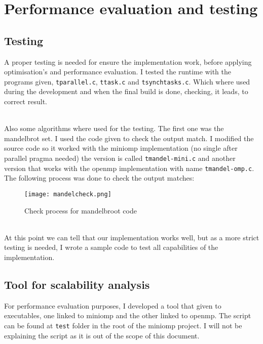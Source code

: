 \section{Performance evaluation and testing}

\subsection{Testing}
A proper testing is needed for ensure the implementation work, before applying optimisation's and performance evaluation. I tested the runtime with the programs given, \texttt{tparallel.c}, \texttt{ttask.c} and \texttt{tsynchtasks.c}. Which where used during the development and when the final build is done, checking, it leads, to correct result.

\par ~\\
Also some algorithms where used for the testing. The first one was the mandelbrot set. I used the code given to check the output match. I modified the source code so it worked with the miniomp implementation (no single after parallel pragma needed) the version is called \texttt{tmandel-mini.c} and another version that works with the openmp implementation with name \texttt{tmandel-omp.c}. The following process was done to check the output matches:

\begin{figure}[h!]
    \centering
    \texttt{[image: mandelcheck.png]}
    \caption{Check process for mandelbroot code}
\end{figure}
\par ~\\
At this point we can tell that our implementation works well, but as a more strict testing is needed, I wrote a sample code to test all capabilities of the implementation.

\subsection{Tool for scalability analysis}
For performance evaluation purposes, I developed a tool that given to executables, one linked to miniomp and the other linked to openmp. The script can be found at \texttt{test} folder in the root of the miniomp project. I will not be explaining the script as it is out of the scope of this document. 


